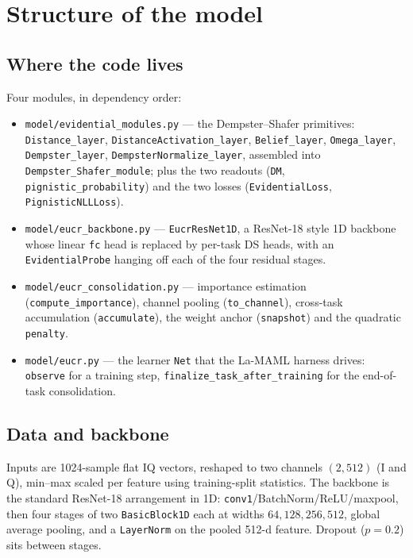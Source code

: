 \documentclass{article}
\begin{document}
\section{Structure of the model}

\subsection{Where the code lives}

Four modules, in dependency order:

\begin{itemize}
  \item \texttt{model/evidential\_modules.py} --- the Dempster--Shafer
        primitives: \texttt{Distance\_layer},
        \texttt{DistanceActivation\_layer}, \texttt{Belief\_layer},
        \texttt{Omega\_layer}, \texttt{Dempster\_layer},
        \texttt{DempsterNormalize\_layer}, assembled into
        \texttt{Dempster\_Shafer\_module}; plus the two readouts (\texttt{DM},
        \texttt{pignistic\_probability}) and the two losses
        (\texttt{EvidentialLoss}, \texttt{PignisticNLLLoss}).
  \item \texttt{model/eucr\_backbone.py} --- \texttt{EucrResNet1D}, a ResNet-18
        style 1D backbone whose linear \texttt{fc} head is replaced by per-task
        DS heads, with an \texttt{EvidentialProbe} hanging off each of the four
        residual stages.
  \item \texttt{model/eucr\_consolidation.py} --- importance estimation
        (\texttt{compute\_importance}), channel pooling (\texttt{to\_channel}),
        cross-task accumulation (\texttt{accumulate}), the weight anchor
        (\texttt{snapshot}) and the quadratic \texttt{penalty}.
  \item \texttt{model/eucr.py} --- the learner \texttt{Net} that the La-MAML
        harness drives: \texttt{observe} for a training step,
        \texttt{finalize\_task\_after\_training} for the end-of-task
        consolidation.
\end{itemize}

\subsection{Data and backbone}

Inputs are 1024-sample flat IQ vectors, reshaped to two channels
$(2,512)$ (I and Q), min--max scaled per feature using training-split
statistics. The backbone is the standard ResNet-18 arrangement in 1D:
\texttt{conv1}/BatchNorm/ReLU/maxpool, then four stages of two
\texttt{BasicBlock1D} each at widths $64,128,256,512$, global average pooling,
and a \texttt{LayerNorm} on the pooled 512-d feature. Dropout ($p=0.2$) sits
between stages.
\end{document}
